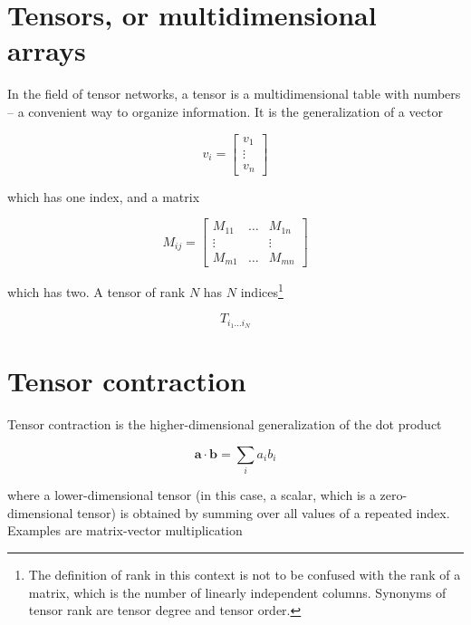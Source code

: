 \section{Tensors, or multidimensional arrays}

In the field of tensor networks, a tensor is a multidimensional table with numbers -- a convenient
way to organize information. It is the generalization of a vector

\begin{equation}
  v_i =
  \begin{bmatrix}
    v_1 \\
    \vdots \\
    v_n
  \end{bmatrix}
\end{equation}

which has one index, and a matrix

\begin{equation}
  M_{i j} = 
  \begin{bmatrix}
  M_{1 1} & \dots & M_{1 n} \\
  \vdots  & & \vdots \\
  M_{m 1} & \dots & M_{m n} 
  \end{bmatrix}
\end{equation}

which has two. A tensor of rank $N$ has $N$ indices\footnote{The definition of rank in this
context is not to be confused with the rank of a matrix, which is the number of
linearly independent columns. Synonyms of tensor rank are tensor degree and
tensor order.}

\begin{equation}
  T_{i_1 \dots i_N}
\end{equation}

\section{Tensor contraction}

Tensor contraction is the higher-dimensional generalization of the dot product

\begin{equation}
  \bm{a} \cdot \bm{b} = \sum_i a_i b_i
\end{equation}

where a lower-dimensional tensor (in this case, a scalar, which is a
zero-dimensional tensor) is obtained by summing over all values of a repeated
index. Examples are matrix-vector multiplication

